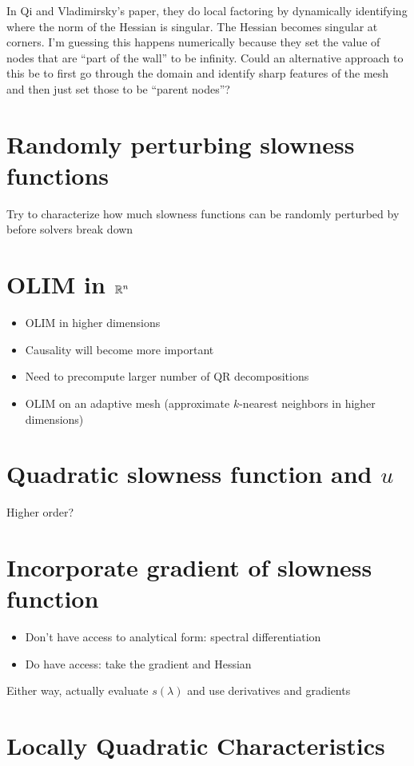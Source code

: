 \documentclass[eikonal.tex]{subfiles}
\begin{document}
In Qi and Vladimirsky's paper, they do local factoring by dynamically
identifying where the norm of the Hessian is singular. The Hessian
becomes singular at corners. I'm guessing this happens numerically
because they set the value of nodes that are ``part of the wall'' to
be infinity. Could an alternative approach to this be to first go
through the domain and identify sharp features of the mesh and then
just set those to be ``parent nodes''?

\section{Randomly perturbing slowness functions}

Try to characterize how much slowness functions can be randomly
perturbed by before solvers break down
\section{OLIM in $\mathbb{R}^n$}

\begin{itemize}
\item OLIM in higher dimensions
\item Causality will become more important
\item Need to precompute larger number of QR decompositions
\item OLIM on an adaptive mesh (approximate $k$-nearest neighbors in
  higher dimensions)
\end{itemize}

\section{Quadratic slowness function and $u$}

Higher order?

\section{Incorporate gradient of slowness function}

\begin{itemize}
\item Don't have access to analytical form: spectral differentiation
\item Do have access: take the gradient and Hessian
\end{itemize}
Either way, actually evaluate $s(\lambda)$ and use derivatives and
gradients

\section{Locally Quadratic Characteristics}

\end{document}
